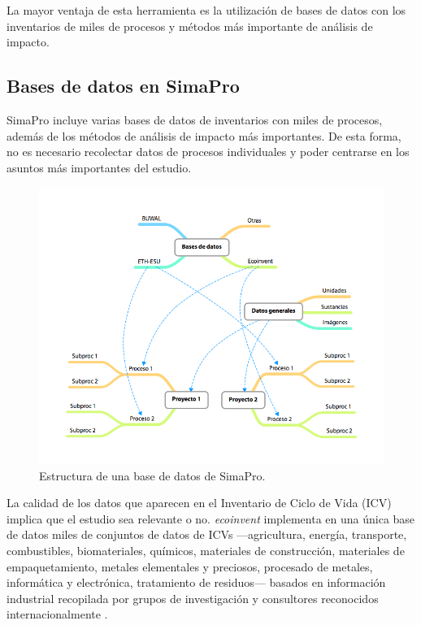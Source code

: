 La mayor ventaja de esta herramienta es la utilización de bases de datos con los inventarios de miles de procesos y métodos más importante de análisis de impacto.

\subsection{Bases de datos en SimaPro}
SimaPro incluye varias bases de datos de inventarios con miles de procesos, además de los métodos de análisis de impacto más importantes. De esta forma, no es necesario recolectar datos de procesos individuales y poder centrarse en los asuntos más importantes del estudio.

\begin{figure}[!htb]
\centering
\includegraphics[width=15cm]{bbddsimapro.png}
\caption{Estructura de una base de datos de SimaPro.}
\label{fig:bbddsimapro}
\end{figure}

La calidad de los datos que aparecen en el Inventario de Ciclo de Vida (ICV) implica que el estudio sea relevante o no. \textit{ecoinvent} implementa en una única base de datos miles de conjuntos de datos de ICVs —agricultura, energía, transporte, combustibles, biomateriales, químicos, materiales de construcción, materiales de empaquetamiento, metales elementales y preciosos, procesado de metales, informática y electrónica, tratamiento de residuos— basados en información industrial recopilada por grupos de investigación y consultores reconocidos internacionalmente \cite{website:ecoinvent}.

